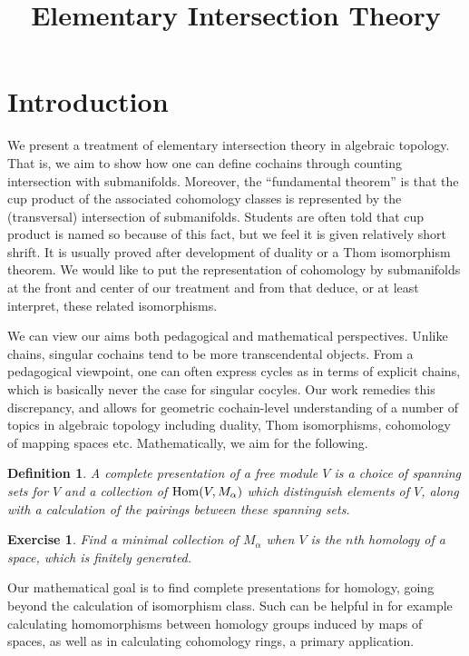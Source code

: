 \documentclass{amsart}          %
\newtheorem{definition}[theorem]{Definition}
\newtheorem{exercise}[theorem]{Exercise}
\begin{document}
\title{Elementary Intersection Theory}
\maketitle

\section{Introduction}

We present a treatment of elementary intersection theory in algebraic topology.  
That is, we aim to show how one can  
define cochains through counting intersection with submanifolds.  
Moreover, the ``fundamental theorem''  is that the cup product of the associated
 cohomology classes is represented by the (transversal) intersection of submanifolds.  
 Students are often told that cup product is named so because of this 
 fact, but we feel it is given relatively short shrift.  It is usually proved after development of duality or a Thom isomorphism theorem.  
 We would like to put the representation of cohomology by submanifolds at the front and center of our treatment and from that deduce, 
 or at least interpret, these related isomorphisms.

We can view our aims both pedagogical and mathematical perspectives.
Unlike chains, singular cochains tend to be more transcendental objects.  
From a pedagogical  viewpoint, one can often express cycles as in terms of explicit chains, which is basically never the case 
for singular cocyles.  Our work remedies this discrepancy, and  allows for geometric cochain-level understanding of a 
number of topics in algebraic topology including duality, Thom isomorphisms, cohomology of mapping spaces etc.   
Mathematically, we aim for the following.

\begin{definition}
A complete presentation of a free module $V$ is a choice of spanning sets for $V$ and a collection of ${\rm Hom}(V, M_\alpha)$
which distinguish elements of $V$, along with a calculation of the pairings between these spanning sets.
\end{definition}

\begin{exercise}
Find a minimal collection of $M_\alpha$ when $V$ is the $n$th homology of  a space, which is finitely generated.
\end{exercise}

Our mathematical goal is to find complete presentations for homology, going beyond the calculation of isomorphism class.  
Such can be helpful in for example calculating homomorphisms between homology groups induced by maps of spaces,
as well as in calculating cohomology rings, a primary application.  
\end{document}
